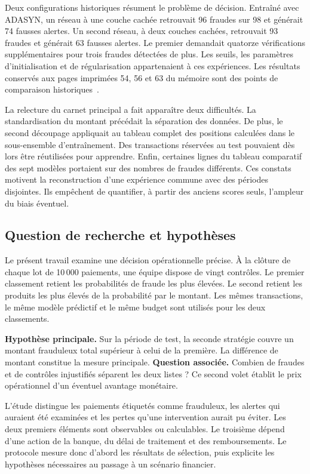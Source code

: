 \documentclass[11pt,a4paper]{article}
\begin{document}
Deux configurations historiques résument le problème de décision. Entraîné avec ADASYN, un réseau à une couche cachée retrouvait 96 fraudes sur 98 et générait 74 fausses alertes. Un second réseau, à deux couches cachées, retrouvait 93 fraudes et générait 63 fausses alertes. Le premier demandait quatorze vérifications supplémentaires pour trois fraudes détectées de plus. Les seuils, les paramètres d'initialisation et de régularisation appartenaient à ces expériences. Les résultats conservés aux pages imprimées 54, 56 et 63 du mémoire sont des points de comparaison historiques~\cite{archive2020}.

La relecture du carnet principal a fait apparaître deux difficultés. La standardisation du montant précédait la séparation des données. De plus, le second découpage appliquait au tableau complet des positions calculées dans le sous-ensemble d'entraînement. Des transactions réservées au test pouvaient dès lors être réutilisées pour apprendre. Enfin, certaines lignes du tableau comparatif des sept modèles portaient sur des nombres de fraudes différents. Ces constats motivent la reconstruction d'une expérience commune avec des périodes disjointes. Ils empêchent de quantifier, à partir des anciens scores seuls, l'ampleur du biais éventuel.

\subsection{Question de recherche et hypothèses}
Le présent travail examine une décision opérationnelle précise. À la clôture de chaque lot de 10\,000 paiements, une équipe dispose de vingt contrôles. Le premier classement retient les probabilités de fraude les plus élevées. Le second retient les produits les plus élevés de la probabilité par le montant. Les mêmes transactions, le même modèle prédictif et le même budget sont utilisés pour les deux classements.

\textbf{Hypothèse principale.} Sur la période de test, la seconde stratégie couvre un montant frauduleux total supérieur à celui de la première. La différence de montant constitue la mesure principale. \textbf{Question associée.} Combien de fraudes et de contrôles injustifiés séparent les deux listes ? Ce second volet établit le prix opérationnel d'un éventuel avantage monétaire.

L'étude distingue les paiements étiquetés comme frauduleux, les alertes qui auraient été examinées et les pertes qu'une intervention aurait pu éviter. Les deux premiers éléments sont observables ou calculables. Le troisième dépend d'une action de la banque, du délai de traitement et des remboursements. Le protocole mesure donc d'abord les résultats de sélection, puis explicite les hypothèses nécessaires au passage à un scénario financier.
\end{document}
